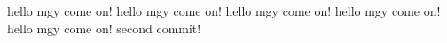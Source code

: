 hello mgy  come on!
hello mgy  come on!
hello mgy  come on!
hello mgy  come on!
hello mgy  come on!
second commit!
